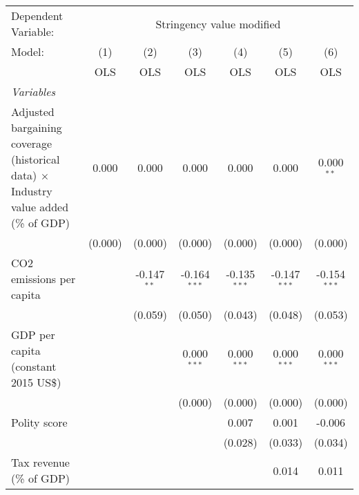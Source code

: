 
\begingroup
\centering
\begin{tabular}{lcccccc}
   \toprule
   Dependent Variable: & \multicolumn{6}{c}{Stringency value modified}\\
   Model:                                                                                     & (1)     & (2)           & (3)            & (4)            & (5)            & (6)\\  
                                                                                              &  OLS    & OLS           & OLS            & OLS            & OLS            & OLS\\  
   \midrule
   \emph{Variables}\\
   Adjusted bargaining coverage (historical data) $\times$ Industry value added (\% of GDP)   & 0.000   & 0.000         & 0.000          & 0.000          & 0.000          & 0.000$^{**}$\\   
                                                                                              & (0.000) & (0.000)       & (0.000)        & (0.000)        & (0.000)        & (0.000)\\   
   CO2 emissions per capita                                                                   &         & -0.147$^{**}$ & -0.164$^{***}$ & -0.135$^{***}$ & -0.147$^{***}$ & -0.154$^{***}$\\   
                                                                                              &         & (0.059)       & (0.050)        & (0.043)        & (0.048)        & (0.053)\\   
   GDP per capita (constant 2015 US\$)                                                        &         &               & 0.000$^{***}$  & 0.000$^{***}$  & 0.000$^{***}$  & 0.000$^{***}$\\   
                                                                                              &         &               & (0.000)        & (0.000)        & (0.000)        & (0.000)\\   
   Polity score                                                                               &         &               &                & 0.007          & 0.001          & -0.006\\   
                                                                                              &         &               &                & (0.028)        & (0.033)        & (0.034)\\   
   Tax revenue (\% of GDP)                                                                    &         &               &                &                & 0.014          & 0.011\\   

\end{tabular}
